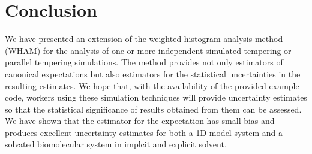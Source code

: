%
%
%
%


\section{Conclusion}

We have presented an extension of the weighted histogram analysis method (WHAM) for the analysis of one or more independent simulated tempering or parallel tempering simulations.  The method provides not only estimators of canonical expectations but also estimators for the statistical uncertainties in the resulting estimates.  We hope that, with the availability of the provided example code, workers using these simulation techniques will provide uncertainty estimates so that the statistical significance of results obtained from them can be assessed.  We have shown that the estimator for the expectation has small bias and produces excellent uncertainty estimates for both a 1D model system and a solvated biomolecular system in implcit and explicit solvent.

